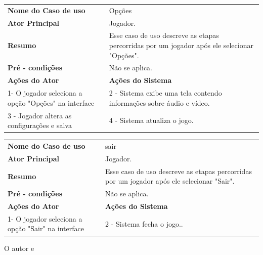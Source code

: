 \begin{table}	
\centering
{}
\begin{tabular}{ | m{5cm} | m{8cm}| } 
\hline
\textbf {Nome do Caso de uso} & Opções \\ 
\textbf {Ator Principal} & Jogador. \\ 
\textbf {Resumo} & Esse caso de uso descreve as etapas percorridas por um jogador após ele selecionar "Opções".\\
\textbf {Pré - condições} & Não se aplica.\\
\hline
\textbf {Ações do Ator} & \textbf {Ações do Sistema}\\
\hline
1- O jogador seleciona a opção "Opções" na interface & 2 - Sistema exibe uma tela contendo informações sobre áudio e vídeo.\\
3 - Jogador altera as configurações e salva & 4 - Sistema atualiza o jogo.\\
\hline
\end{tabular}
\end{table}

\begin{table}	
\centering
{}
\begin{tabular}{ | m{5cm} | m{8cm}| } 
\hline
\textbf {Nome do Caso de uso} & sair \\ 
\textbf {Ator Principal} & Jogador. \\ 
\textbf {Resumo} & Esse caso de uso descreve as etapas percorridas por um jogador após ele selecionar "Sair".\\
\textbf {Pré - condições} & Não se aplica.\\
\hline
\textbf {Ações do Ator} & \textbf {Ações do Sistema}\\
\hline
1- O jogador seleciona a opção "Sair" na interface & 2 - Sistema fecha o jogo..\\

\hline
\end{tabular}
\end{table}



\cite{Huetal2000} \lipsum[2] 

O autor \cite{lamport1986latex} e \cite{Maia2011} \lipsum[2] 







